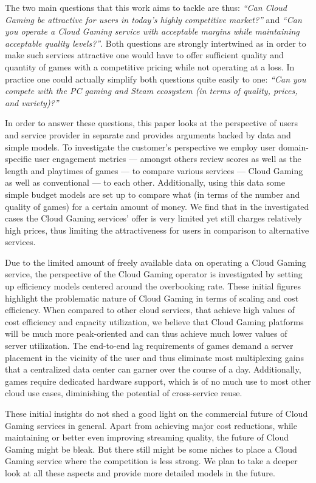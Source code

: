 The two main questions that this work aims to tackle are thus: \textit{``Can Cloud Gaming be attractive for users in today's highly competitive market?''} and \textit{``Can you operate a Cloud Gaming service with acceptable margins while maintaining acceptable quality levels?''}. Both questions are strongly intertwined as in order to make such services attractive one would have to offer sufficient quality and quantity of games with a competitive pricing while not operating at a loss. In practice one could actually simplify both questions quite easily to one: \textit{``Can you compete with the PC gaming and Steam ecosystem (in terms of quality, prices, and variety)?''}

In order to answer these questions, this paper looks at the perspective of users and service provider in separate and provides arguments backed by data and simple models. To investigate the customer's perspective we employ user domain-specific user engagement metrics --- amongst others review scores as well as the length and playtimes of games --- to compare various services --- Cloud Gaming as well as conventional --- to each other. Additionally, using this data some simple budget models are set up to compare what (in terms of the number and quality of games) for a certain amount of money. We find that in the investigated cases the Cloud Gaming services' offer is very limited yet still charges relatively high prices, thus limiting the attractiveness for users in comparison to alternative services.

Due to the limited amount of freely available data on operating a Cloud Gaming service, the perspective of the Cloud Gaming operator is investigated by setting up efficiency models centered around the overbooking rate. These initial figures highlight the problematic nature of Cloud Gaming in terms of scaling and cost efficiency. When compared to other cloud services, that achieve high values of cost efficiency and capacity utilization, we believe that Cloud Gaming platforms will be much more peak-oriented and can thus achieve much lower values of server utilization. The end-to-end lag requirements of games demand a server placement in the vicinity of the user and thus eliminate most multiplexing gains that a centralized data center can garner over the course of a day. Additionally, games require dedicated hardware support, which is of no much use to most other cloud use cases, diminishing the potential of cross-service reuse.

These initial insights do not shed a good light on the commercial future of Cloud Gaming services in general. Apart from achieving major cost reductions, while maintaining or better even improving streaming quality, the future of Cloud Gaming might be bleak. But there still might be some niches to place a Cloud Gaming service where the competition is less strong. We plan to take a deeper look at all these aspects and provide more detailed models in the future.

